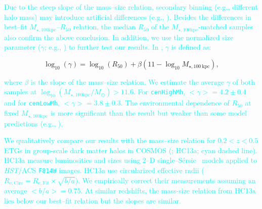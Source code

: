 \documentclass[a4paper,fleqn,usenatbib]{mnras}
\def\ser{{S\'{e}rsic\ }}
\def\rbcg{\texttt{cenHighMh}}
\def\nbcg{\texttt{cenLowMh}}
\def\minn{{$M_{\star,10\mathrm{kpc}}$}}
\def\mtot{{$M_{\star,100\mathrm{kpc}}$}}
\def\logmtot{{$\log_{10} (M_{\star,100\mathrm{kpc}}/M_{\odot})$}}
\def\mden{{$\mu_{\star}$}}
\newcommand{\song}[1]{\textcolor{cyan}{#1}}
\begin{document}
    \song{
    Due to the steep slope of the mass--size relation, secondary binning 
    (e.g., different halo mass) may introduce artificial differences 
    (e.g., \citealt{Sonnenfeld2017}).
    Besides the differences in best--fit \mtot{}--$R_{\mathrm{50}}$ relation, the 
    median $R_{\mathrm{50}}$ of the \mtot{}-matched samples also confirm the above 
    conclusion. 
    In addition, we use the normalized size parameter ($\gamma$; e.g., 
    \citealt{Newman2012, HCompany13}) to further test our results. 
    In \citet{HCompany13}, $\gamma$ is defined as:
    }
    
    \begin{equation}
        \log_{10}(\gamma) = \log_{10} (R_{\mathrm{50}}) + \beta (11 - \log_{10}M_{\star, 100\ \mathrm{kpc}}),
    \end{equation}
    
    \song{
    where $\beta$ is the slope of the mass--size relation.
    We estimate the average $\gamma$ of both samples at \logmtot{}$>11.6$. 
    For \rbcg{}, $<\gamma> = 4.2\pm0.4$ and for \nbcg{}, 
    $<\gamma> = 3.8\pm0.3$. 
    The environmental dependence of $R_{\mathrm{50}}$ at fixed \mtot{} is more 
    significant than the \citet{HCompany13} result but weaker than some 
    model predictions (e.g., \citealt{Shankar2014}).}
    
    \song{
    We qualitatively compare our results with the mass--size relation for 
    $0.2 < z < 0.5$ ETGs in group-scale dark matter halos in COSMOS 
    (\citealt{HueartasCompany2013b}; HC13a; cyan dashed line).
    HC13a measure luminosities and sizes using 2--D single--\ser{} models applied to 
    \textit{HST}/ACS \texttt{F814W} images. 
    HC13a use circularized effective radii 
    ($R_{\mathrm{e,Circ}} = R_{\mathrm{e,Fit}} \times \sqrt{b/a}$). 
    We empirically correct their measurements assuming an average $<b/a>=0.75$.
    At similar redshifts, the mass-size relation from HC13a lies below our 
    best--fit relation but the slopes are similar.
    }
    
\end{document}
